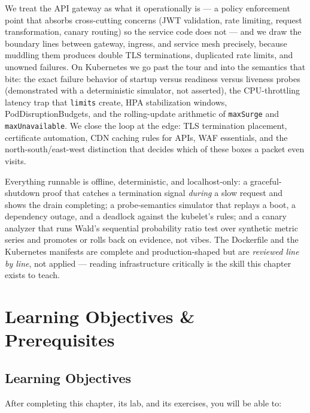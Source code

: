 We treat the API gateway as what it operationally is --- a policy
enforcement point that absorbs cross-cutting concerns (JWT validation,
rate limiting, request transformation, canary routing) so the service
code does not --- and we draw the boundary lines between gateway, ingress,
and service mesh precisely, because muddling them produces double TLS
terminations, duplicated rate limits, and unowned failures. On Kubernetes
we go past the tour and into the semantics that bite: the exact failure
behavior of startup versus readiness versus liveness probes (demonstrated
with a deterministic simulator, not asserted), the CPU-throttling latency
trap that \texttt{limits} create, HPA stabilization windows,
PodDisruptionBudgets, and the rolling-update arithmetic of
\texttt{maxSurge} and \texttt{maxUnavailable}. We close the loop at the
edge: TLS termination placement, certificate automation, CDN caching rules
for APIs, WAF essentials, and the north-south/east-west distinction that
decides which of these boxes a packet even visits.

Everything runnable is offline, deterministic, and localhost-only: a
graceful-shutdown proof that catches a termination signal \emph{during} a
slow request and shows the drain completing; a probe-semantics simulator
that replays a boot, a dependency outage, and a deadlock against the
kubelet's rules; and a canary analyzer that runs Wald's sequential
probability ratio test over synthetic metric series and promotes or rolls
back on evidence, not vibes. The Dockerfile and the Kubernetes manifests
are complete and production-shaped but are \emph{reviewed line by line},
not applied --- reading infrastructure critically is the skill this
chapter exists to teach.

\section{Learning Objectives \& Prerequisites}
\label{sec:ch17-objectives}

\subsection*{Learning Objectives}
After completing this chapter, its lab, and its exercises, you will be able
to:

